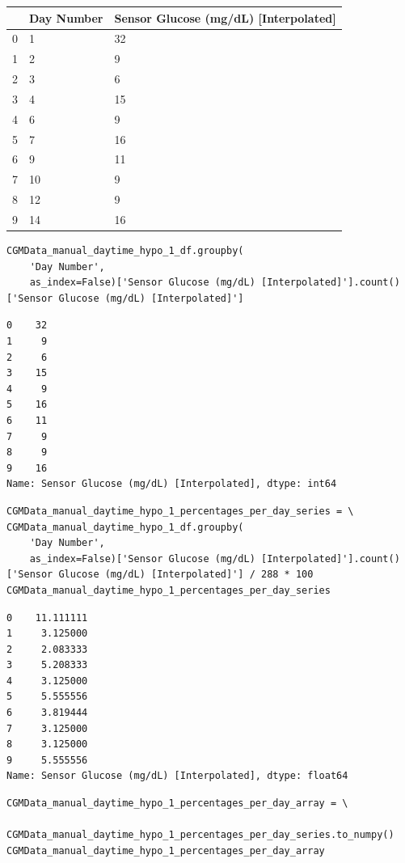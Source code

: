 \bigskip\noindent
\begin{tabular}{p{}p{}p{}}
\toprule
 & Day Number & Sensor Glucose (mg/dL) [Interpolated] \\
\hline
0 & 1 & 32 \\
\hline
1 & 2 & 9 \\
\hline
2 & 3 & 6 \\
\hline
3 & 4 & 15 \\
\hline
4 & 6 & 9 \\
\hline
5 & 7 & 16 \\
\hline
6 & 9 & 11 \\
\hline
7 & 10 & 9 \\
\hline
8 & 12 & 9 \\
\hline
9 & 14 & 16 \\
\hline
\bottomrule
\end{tabular}

\bigskip

\begin{verbatim}
CGMData_manual_daytime_hypo_1_df.groupby(
    'Day Number', 
    as_index=False)['Sensor Glucose (mg/dL) [Interpolated]'].count()['Sensor Glucose (mg/dL) [Interpolated]']
\end{verbatim}

\begin{verbatim}
0    32
1     9
2     6
3    15
4     9
5    16
6    11
7     9
8     9
9    16
Name: Sensor Glucose (mg/dL) [Interpolated], dtype: int64
\end{verbatim}

\begin{verbatim}
CGMData_manual_daytime_hypo_1_percentages_per_day_series = \
CGMData_manual_daytime_hypo_1_df.groupby(
    'Day Number', 
    as_index=False)['Sensor Glucose (mg/dL) [Interpolated]'].count()['Sensor Glucose (mg/dL) [Interpolated]'] / 288 * 100
CGMData_manual_daytime_hypo_1_percentages_per_day_series
\end{verbatim}

\begin{verbatim}
0    11.111111
1     3.125000
2     2.083333
3     5.208333
4     3.125000
5     5.555556
6     3.819444
7     3.125000
8     3.125000
9     5.555556
Name: Sensor Glucose (mg/dL) [Interpolated], dtype: float64
\end{verbatim}

\begin{verbatim}
CGMData_manual_daytime_hypo_1_percentages_per_day_array = \
    CGMData_manual_daytime_hypo_1_percentages_per_day_series.to_numpy()
CGMData_manual_daytime_hypo_1_percentages_per_day_array
\end{verbatim}

